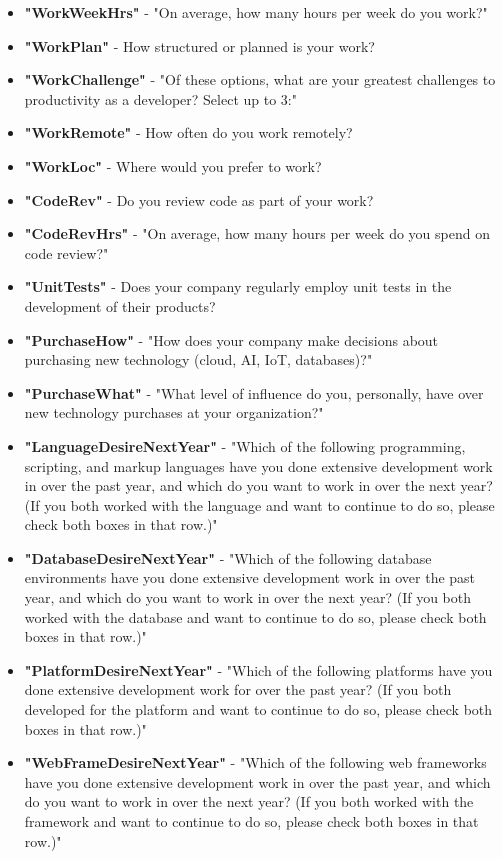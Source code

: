 \begin{appendices}
\begin{itemize}
        \item \textbf{"WorkWeekHrs"} - "On average, how many hours per week do you work?"
        \item \textbf{"WorkPlan"} - How structured or planned is your work?
        \item \textbf{"WorkChallenge"} - "Of these options, what are your greatest challenges to productivity as a developer? Select up to 3:"
        \item \textbf{"WorkRemote"} - How often do you work remotely?
        \item \textbf{"WorkLoc"} - Where would you prefer to work?
        \item \textbf{"CodeRev"} - Do you review code as part of your work?
        \item \textbf{"CodeRevHrs"} - "On average, how many hours per week do you spend on code review?"
        \item \textbf{"UnitTests"} - Does your company regularly employ unit tests in the development of their products?
        \item \textbf{"PurchaseHow"} - "How does your company make decisions about purchasing new technology (cloud, AI, IoT, databases)?"
        \item \textbf{"PurchaseWhat"} - "What level of influence do you, personally, have over new technology purchases at your organization?"
        \item \textbf{"LanguageDesireNextYear"} - "Which of the following programming, scripting, and markup languages have you done extensive development work in over the past year, and which do you want to work in over the next year?  (If you both worked with the language and want to continue to do so, please check both boxes in that row.)"
        \item \textbf{"DatabaseDesireNextYear"} - "Which of the following database environments have you done extensive development work in over the past year, and which do you want to work in over the next year?   (If you both worked with the database and want to continue to do so, please check both boxes in that row.)"
        \item \textbf{"PlatformDesireNextYear"} - "Which of the following platforms have you done extensive development work for over the past year?   (If you both developed for the platform and want to continue to do so, please check both boxes in that row.)"
        \item \textbf{"WebFrameDesireNextYear"} - "Which of the following web frameworks have you done extensive development work in over the past year, and which do you want to work in over the next year? (If you both worked with the framework and want to continue to do so, please check both boxes in that row.)"

\end{itemize}
\end{appendices}
